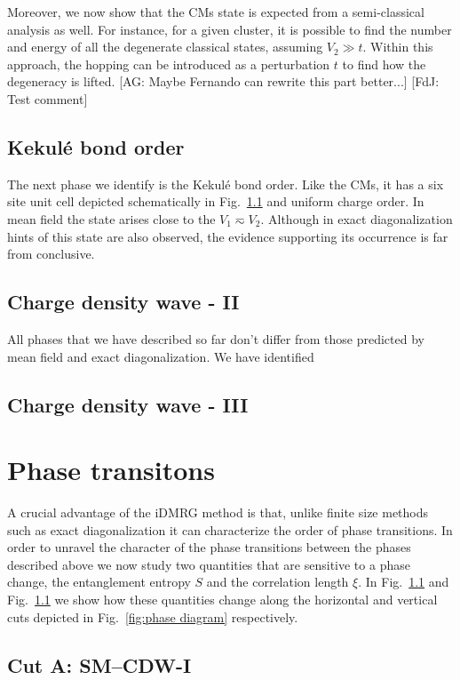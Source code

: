 \documentclass[aps,prx,10pt,twocolumn,floatfix,superscriptaddress,showpacs,numerical,footinbib]{revtex4-1}
\newcommand{\noteAG}[1]{{\color{blue} [AG: #1]}}
\newcommand{\noteFdJ}[1]{{\color{cyan} [FdJ: #1]}}
\begin{document}
% 
Moreover, we now show that the CMs state is expected from a semi-classical analysis as well.
%
For instance, for a given cluster, it is possible to find the number and energy of all the degenerate classical states, assuming $V_{2}\gg t$.
%
Within this approach, the hopping can be introduced as a perturbation $t$ to find how the degeneracy is lifted.
\noteAG{Maybe Fernando can rewrite this part better...} \noteFdJ{Test comment}


\subsection{Kekul\'{e} bond order}
%
The next phase we identify is the Kekul\'{e}
bond order.
%
Like the CMs, it has a six site unit cell depicted schematically in Fig.~\ref{}
and uniform charge order.
%
In mean field the state arises close to the $V_{1}\eqsim V_{2}$.
%
Although in exact diagonalization hints of this state are also observed,
the evidence supporting its occurrence is far from conclusive.



\subsection{Charge density wave - II}
%
All phases that we have described so far don't differ
from those predicted by mean field and exact diagonalization.
%
We have identified
%
\subsection{Charge density wave - III}
%



\section{Phase transitons}
%
A crucial advantage of the iDMRG method is that, unlike finite
size methods such as exact diagonalization it can characterize the order of phase transitions.
%
In order to unravel the character of the phase transitions between
the phases described above we now study two quantities that are sensitive
to a phase change, the entanglement entropy $S$ and the correlation length $\xi$.
%
In Fig.~\ref{}  and Fig.~\ref{} we show how these quantities change along
the horizontal and vertical cuts depicted in Fig.~\ref{fig:phase diagram} respectively.
%

\subsection{Cut A: SM--CDW-I}
\end{document}
